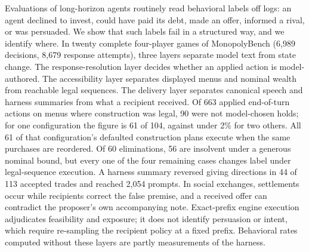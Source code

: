

Evaluations of long-horizon agents routinely read behavioral labels off logs: an agent
declined to invest, could have paid its debt, made an offer, informed a rival, or was
persuaded. We show that such labels fail in a structured way, and we identify where. In
twenty complete four-player games of MonopolyBench (6,989 decisions, 8,679 response
attempts), three layers separate model text from state change. The response-resolution
layer decides whether an applied action is model-authored. The accessibility layer
separates displayed menus and nominal wealth from reachable legal sequences. The
delivery layer separates canonical speech and harness summaries from what a recipient
received. Of 663 applied end-of-turn actions on menus where construction was legal, 90
were not model-chosen holds; for one configuration the figure is 61 of 104, against
under 2\% for two others. All 61 of that configuration's defaulted construction plans
execute when the same purchases are reordered. Of 60 eliminations, 56 are insolvent
under a generous nominal bound, but every one of the four remaining cases changes label
under legal-sequence execution. A harness summary reversed giving directions in 44 of
113 accepted trades and reached 2,054 prompts. In social exchanges, settlements occur
while recipients correct the false premise, and a received offer can contradict the
proposer's own accompanying note. Exact-prefix engine execution adjudicates feasibility
and exposure; it does not identify persuasion or intent, which require re-sampling the
recipient policy at a fixed prefix. Behavioral rates computed without these layers are
partly measurements of the harness.


